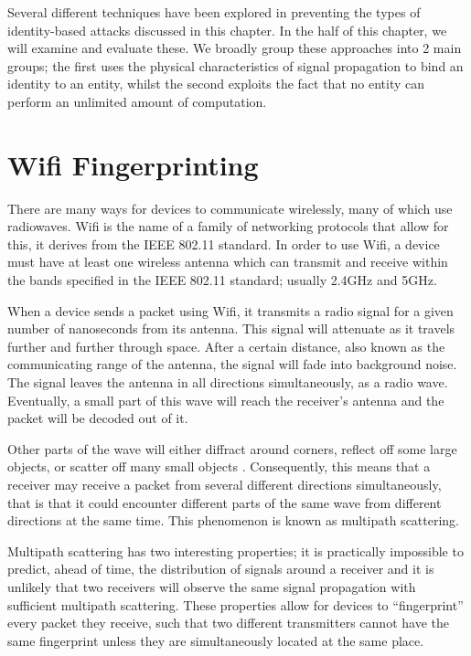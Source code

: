\noindent\makebox[\linewidth]{\rule{\textwidth}{1pt}}


Several different techniques have been explored in preventing the types of identity-based attacks discussed in this chapter. In the  half of this chapter, we will examine and evaluate these. We broadly group these approaches into 2 main groups; the first uses the physical characteristics of signal propagation to bind an identity to an entity, whilst the second exploits the fact that no entity can perform an unlimited amount of computation.

\section{Wifi Fingerprinting}

There are many ways for devices to communicate wirelessly, many of which use radiowaves. Wifi is the name of a family of networking protocols that allow for this, it derives from the IEEE 802.11 standard. In order to use Wifi, a device must have at least one wireless antenna which can transmit and receive within the bands specified in the IEEE 802.11 standard; usually 2.4GHz and 5GHz.

When a device sends a packet using Wifi, it transmits a radio signal for a given number of nanoseconds from its antenna. This signal will attenuate as it travels further and further through space. After a certain distance, also known as the communicating range of the antenna, the signal will fade into background noise. The signal leaves the antenna in all directions simultaneously, as a radio wave. Eventually, a small part of this wave will reach the receiver's antenna and the packet will be decoded out of it.

Other parts of the wave will either diffract around corners, reflect off some large objects, or scatter off many small objects \cite{SignalProp}. Consequently, this means that a receiver may receive a packet from several different directions simultaneously, that is that it could encounter different parts of the same wave from different directions at the same time. This phenomenon is known as multipath scattering. %

Multipath scattering has two interesting properties; it is practically impossible to predict, ahead of time, the distribution of signals around a receiver and it is unlikely that two receivers will observe the same signal propagation with sufficient multipath scattering\citationneeded. These properties allow for devices to ``fingerprint'' every packet they receive, such that two different transmitters cannot have the same fingerprint unless they are simultaneously located at the same place. 

